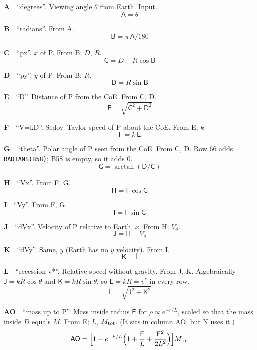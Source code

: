\documentclass[10pt]{article}
\newcommand{\cl}[1]{\mathsf{#1}}
\newcommand{\col}[3]{\par\smallskip\textbf{#1}\ \ ``#2''. #3}
\begin{document}
\col{A}{degrees}{Viewing angle $\theta$ from Earth. Input.}
\begin{equation}\cl{A}=\theta\end{equation}
\col{B}{radians}{From A.}
\begin{equation}\cl{B}=\pi\,\cl{A}/180\end{equation}
\col{C}{px}{$x$ of P. From B; $D$, $R$.}
\begin{equation}\cl{C}=D+R\cos\cl{B}\end{equation}
\col{D}{py}{$y$ of P. From B; $R$.}
\begin{equation}\cl{D}=R\sin\cl{B}\end{equation}
\col{E}{D}{Distance of P from the CoE. From C, D.}
\begin{equation}\cl{E}=\sqrt{\cl{C}^2+\cl{D}^2}\end{equation}
\col{F}{V=kD}{Sedov--Taylor speed of P about the CoE. From E; $k$.}
\begin{equation}\cl{F}=k\,\cl{E}\end{equation}
\col{G}{theta}{Polar angle of P seen from the CoE. From C, D. Row 66 adds \texttt{RADIANS(B58)}; B58 is empty, so it adds 0.}
\begin{equation}\cl{G}=\arctan(\cl{D}/\cl{C})\end{equation}
\col{H}{Vx}{From F, G.}
\begin{equation}\cl{H}=\cl{F}\cos\cl{G}\end{equation}
\col{I}{Vy}{From F, G.}
\begin{equation}\cl{I}=\cl{F}\sin\cl{G}\end{equation}
\col{J}{dVx}{Velocity of P relative to Earth, $x$. From H; $V_o$.}
\begin{equation}\cl{J}=\cl{H}-V_o\end{equation}
\col{K}{dVy}{Same, $y$ (Earth has no $y$ velocity). From I.}
\begin{equation}\cl{K}=\cl{I}\end{equation}
\col{L}{recession v*}{Relative speed without gravity. From J, K. Algebraically $\cl{J}=kR\cos\theta$ and $\cl{K}=kR\sin\theta$, so $\cl{L}=kR=v^*$ in every row.}
\begin{equation}\cl{L}=\sqrt{\cl{J}^2+\cl{K}^2}\end{equation}
\col{AO}{mass up to P}{Mass inside radius $\cl{E}$ for $\rho\propto e^{-r/L}$, scaled so that the mass inside $D$ equals $M$. From E; $L$, $M_{\rm tot}$. (It sits in column AO, but N uses it.)}
\begin{equation}\cl{AO}=\Bigl[1-e^{-\cl{E}/L}\Bigl(1+\frac{\cl{E}}{L}+\frac{\cl{E}^2}{2L^2}\Bigr)\Bigr]M_{\rm tot}\end{equation}
\end{document}
